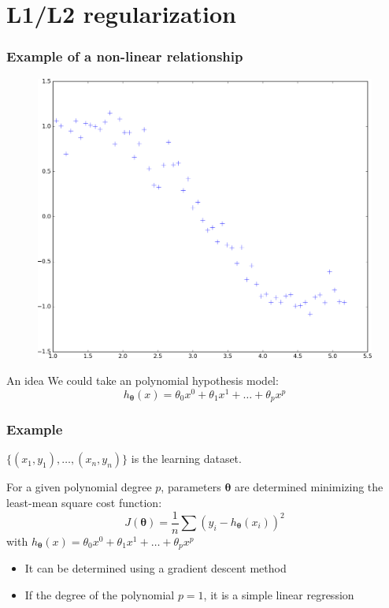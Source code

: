 \documentclass[handout, 10pt]{beamer}
\begin{document}
\section{L1/L2 regularization}

\begin{frame}
\frametitle{Example of a non-linear relationship}
\begin{figure}
\includegraphics[height=0.55\textheight]{./scatter.png}
\end{figure}
\begin{block}{An idea}
We could take an polynomial hypothesis model:
$$
h_{\bm{\theta}}(x) = \theta_0 x^0 + \theta_1 x^1 + \ldots + \theta_p x^p
$$
\end{block}
\end{frame}
\begin{frame}
\frametitle{Example}
$\{(x_1,y_1),\ldots,(x_n,y_n)\}$ is the learning dataset.

For a given polynomial degree $p$, parameters $\bm{\theta}$ are determined minimizing the 
least-mean square cost function:
$$
J(\bm{\theta}) = \frac{1}{n} \sum (y_i - h_{\bm{\theta}}(x_i))^2
$$
with $h_{\bm{\theta}}(x) = \theta_0 x^0 + \theta_1 x^1 + \ldots + \theta_p x^p$
\begin{itemize}[<+->]
\item It can be determined using a gradient descent method
\item If the degree of the polynomial $p=1$, it is a simple linear regression
\end{itemize}
\end{frame}
\end{document}
